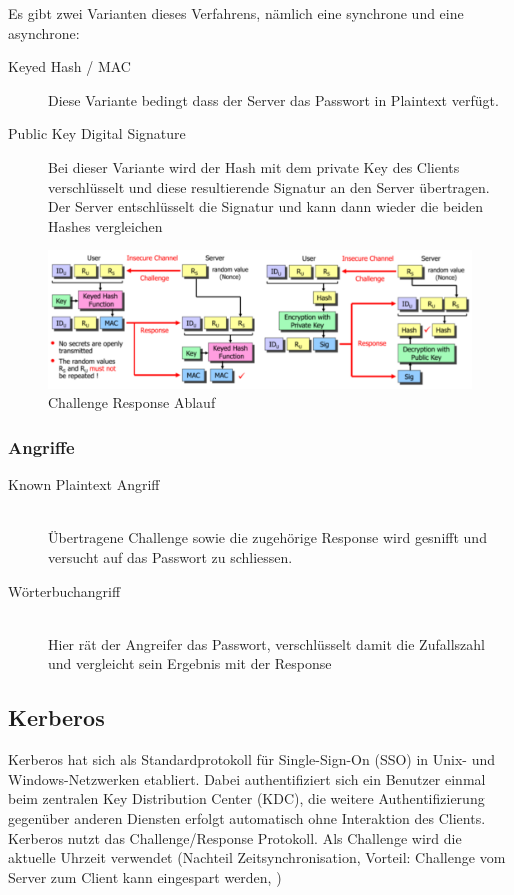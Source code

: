 Es gibt zwei Varianten dieses Verfahrens, nämlich eine synchrone und eine asynchrone:
\begin{description}
	\item[Keyed Hash / MAC] Diese Variante bedingt dass der Server das Passwort in Plaintext verfügt.
	\item[Public Key Digital Signature] Bei dieser Variante wird der Hash mit dem private Key des Clients verschlüsselt und diese resultierende Signatur an den Server übertragen. Der Server entschlüsselt die Signatur und kann dann wieder die beiden Hashes vergleichen
\end{description}
\begin{figure}[h]
\centering
\includegraphics[width=1\linewidth]{images/challenge_response}
\caption{Challenge Response Ablauf}
\end{figure}

\subsubsection{Angriffe}
\begin{description}
	\item[Known Plaintext Angriff] \hfill \\ Übertragene Challenge sowie die zugehörige Response wird gesnifft und versucht auf das Passwort zu schliessen. 
	\item[Wörterbuchangriff] \hfill \\ Hier rät der Angreifer das Passwort, verschlüsselt damit die Zufallszahl und vergleicht sein Ergebnis mit der Response
\end{description}

\subsection{Kerberos}
Kerberos hat sich als Standardprotokoll für Single-Sign-On (SSO) in Unix- und Windows-Netzwerken etabliert. Dabei authentifiziert sich ein Benutzer einmal beim zentralen Key Distribution Center (KDC), die weitere Authentifizierung gegenüber anderen Diensten erfolgt automatisch ohne Interaktion des Clients. Kerberos nutzt das Challenge/Response Protokoll. Als Challenge wird die aktuelle Uhrzeit verwendet (Nachteil Zeitsynchronisation, Vorteil: Challenge vom Server zum Client kann eingespart werden, )

